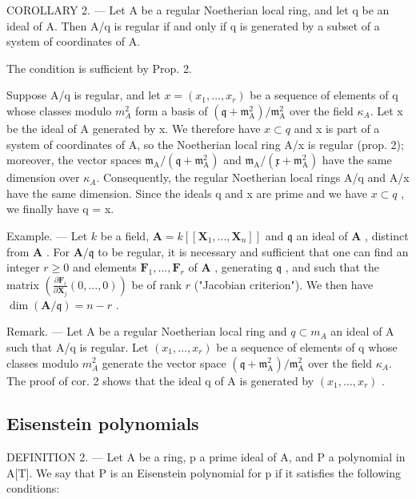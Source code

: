 COROLLARY 2. --- Let A be a regular Noetherian local ring, and let q be an ideal of A. Then A/q is regular if and only if q is generated by a subset of a system of coordinates of A.

The condition is sufficient by Prop. 2.

Suppose A/q is regular, and let \(x = (x_{1}, \ldots, x_{r})\) be a sequence of elements of q whose classes modulo \(m_{A}^{2}\) form a basis of \((\mathfrak{q} + \mathfrak{m}_{\mathrm{A}}^{2})/\mathfrak{m}_{\mathrm{A}}^{2}\) over the field \(\kappa_{A}\). Let x be the ideal of A generated by x. We therefore have \(x \subset q\) and x is part of a system of coordinates of A, so the Noetherian local ring A/x is regular (prop. 2); moreover, the vector spaces \(\mathfrak{m}_{\mathrm{A}}/(\mathfrak{q} + \mathfrak{m}_{\mathrm{A}}^{2})\) and \(\mathfrak{m}_{\mathrm{A}}/(\mathfrak{x} + \mathfrak{m}_{\mathrm{A}}^{2})\) have the same dimension over \(\kappa_{A}\). Consequently, the regular Noetherian local rings A/q and A/x have the same dimension. Since the ideals q and x are prime and we have \(x \subset q\) , we finally have q = x.

Example. --- Let \(k\) be a field, \(\mathbf{A} = k[[\mathbf{X}_1, ..., \mathbf{X}_n]]\) and \(\mathfrak{q}\) an ideal of \(\mathbf{A}\) , distinct from \(\mathbf{A}\) . For \(\mathbf{A}/\mathfrak{q}\) to be regular, it is necessary and sufficient that one can find an integer \(r \geqslant 0\) and elements \(\mathbf{F}_1, ..., \mathbf{F}_r\) of \(\mathbf{A}\) , generating \(\mathfrak{q}\) , and such that the matrix \(\left(\frac{\partial\mathbf{F}_i}{\partial\mathbf{X}_j}(0, ..., 0)\right)\) be of rank \(r\) ("Jacobian criterion"). We then have \(\dim(\mathbf{A}/\mathfrak{q}) = n - r\) .

Remark. --- Let A be a regular Noetherian local ring and \(q \subset m_{A}\) an ideal of A such that A/q is regular. Let \((x_{1}, \ldots, x_{r})\) be a sequence of elements of q whose classes modulo \(m_{A}^{2}\) generate the vector space \((\mathfrak{q} + \mathfrak{m}_{\mathrm{A}}^{2}) / \mathfrak{m}_{\mathrm{A}}^{2}\) over the field \(\kappa_{A}\). The proof of cor. 2 shows that the ideal q of A is generated by \((x_{1}, \ldots, x_{r})\) .

\subsection{Eisenstein polynomials}

DEFINITION 2. --- Let A be a ring, p a prime ideal of A, and P a polynomial in A{[}T{]}. We say that P is an Eisenstein polynomial for p if it satisfies the following conditions:

